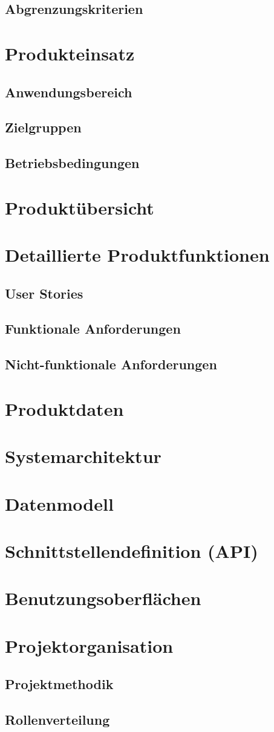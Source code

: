 \documentclass[%
	ngerman,
	12pt,
	a4paper
]{scrbook}
\begin{document}
\section{Abgrenzungskriterien}

\chapter{Produkteinsatz}
\section{Anwendungsbereich}
\section{Zielgruppen}
\section{Betriebsbedingungen}

\chapter{Produktübersicht}

\chapter{Detaillierte Produktfunktionen}
\section{User Stories}
\section{Funktionale Anforderungen}
\section{Nicht-funktionale Anforderungen}

\chapter{Produktdaten}
\chapter{Systemarchitektur}
\chapter{Datenmodell}
\chapter{Schnittstellendefinition (API)}
\chapter{Benutzungsoberflächen}

\chapter{Projektorganisation}
\section{Projektmethodik}
\section{Rollenverteilung}
\end{document}
